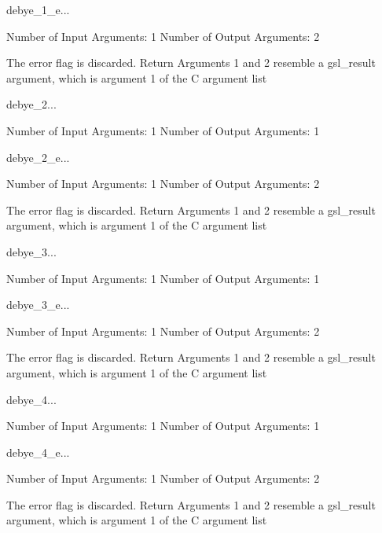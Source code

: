 \begin{funcdesc}{debye_1_e}{...}

    Number of Input  Arguments:  1
    Number of Output Arguments:  2

The error flag is discarded.
Return Arguments 1 and 2 resemble a gsl_result argument,
	which is  argument 1 of the C argument list

\end{funcdesc}

\begin{funcdesc}{debye_2}{...}

    Number of Input  Arguments:  1
    Number of Output Arguments:  1
\end{funcdesc}

\begin{funcdesc}{debye_2_e}{...}

    Number of Input  Arguments:  1
    Number of Output Arguments:  2

The error flag is discarded.
Return Arguments 1 and 2 resemble a gsl_result argument,
	which is  argument 1 of the C argument list

\end{funcdesc}

\begin{funcdesc}{debye_3}{...}

    Number of Input  Arguments:  1
    Number of Output Arguments:  1
\end{funcdesc}

\begin{funcdesc}{debye_3_e}{...}

    Number of Input  Arguments:  1
    Number of Output Arguments:  2

The error flag is discarded.
Return Arguments 1 and 2 resemble a gsl_result argument,
	which is  argument 1 of the C argument list

\end{funcdesc}

\begin{funcdesc}{debye_4}{...}

    Number of Input  Arguments:  1
    Number of Output Arguments:  1
\end{funcdesc}

\begin{funcdesc}{debye_4_e}{...}

    Number of Input  Arguments:  1
    Number of Output Arguments:  2

The error flag is discarded.
Return Arguments 1 and 2 resemble a gsl_result argument,
	which is  argument 1 of the C argument list

\end{funcdesc}

